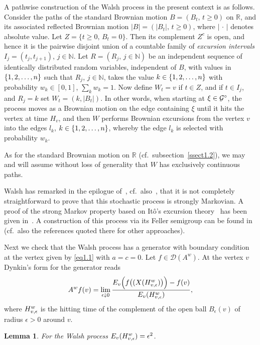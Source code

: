 \documentclass[11pt,a4paper]{amsart}
\newcommand{\gep}{\epsilon}
\newcommand{\cD}{\mathcal{D}}
\newcommand{\cG}{\mathcal{G}}
\newcommand{\1}{1}
\newcommand{\N}{\mathbb{N}}
\newcommand{\R}{\mathbb{R}}
\newtheorem{lemma}[theorem]{Lemma}
\theoremstyle{remark}
\newcommand{\op}{\ensuremath^\circ}
\newcommand{\cGo}{\ensuremath\cG\op}
\newcommand{\sn}{\ensuremath\{1,2,\dotsc,n\}}
\newcommand{\da}{\ensuremath\downarrow}
\newcommand{\TW}{\ensuremath H^w}
\numberwithin{equation}{section}
\begin{document}
A pathwise construction of the Walsh process in the present context is as follows.
Consider the paths of the standard Brownian motion $B=(B_t,\,t\ge 0)$ on $\R$, and
its associated reflected Brownian motion $|B|=(|B_t|,\,t\ge 0)$, where $|\,\cdot\,|$
denotes absolute value. Let $Z=\{t\ge 0,\,B_t=0\}$. Then its complement $Z^c$ is
open, and hence it is the pairwise disjoint union of a countable family of
\emph{excursion intervals} $I_j = (t_j, t_{j+1})$, $j\in\N$. Let $R=(R_j,\,j\in\N)$
be an independent sequence of identically distributed random variables, independent of $B$,
with values in $\sn$ such that $R_j$, $j\in\N$, takes the value $k\in\sn$ with probability
$w_k\in [0,1]$, $\sum_k w_k =1$. Now define $W_t = v$ if $t\in Z$, and if $t\in I_j$, and
$R_j = k$ set $W_t = (k, |B_t|)$. In other words, when starting at $\xi\in\cGo$, the
process moves as a Brownian motion on the edge containing $\xi$ until it hits the
vertex at time $H_v$, and then $W$ performs Brownian excursions
from the vertex $v$ into the edges $l_k$, $k\in\sn$, whereby the edge $l_k$ is
selected with probability $w_k$.

As for the standard Brownian motion on $\R$ (cf.\ subsection~\ref{ssect1.2}), we
may and will assume without loss of generality that $W$ has exclusively continuous
paths.

Walsh has remarked in the epilogue of~\cite{Wa78}, cf.\ also~\cite{BaPi89}, that it
is not completely straightforward to prove that this stochastic process is strongly
Markovian. A proof of the strong Markov property based on It\^o's excursion
theory~\cite{It71a} has been given in~\cite{Sa86a, Sa86b}. A construction of this
process via its Feller semigroup can be found in~\cite{BaPi89} (cf.\ also the references
quoted there for other approaches).

Next we check that the Walsh process has a generator with boundary condition at the
vertex given by \eqref{eq1.1} with $a=c=0$. Let $f\in\cD(A^w)$. At the vertex $v$
Dynkin's form for the generator reads
\begin{equation}    \label{eq2.1}
    A^w f(v) = \lim_{\gep\da 0} \frac{E_v\Bigl(f\bigl((X(\TW_{v,\gep})\bigr)\Bigr)-f(v)}
                                  {E_v(\TW_{v,\gep})},
\end{equation}
where $\TW_{v,\gep}$ is the hitting time of the complement of the open ball
$B_\gep(v)$ of radius $\gep>0$ around $v$.

\begin{lemma}   \label{lem2.1}
For the Walsh process $E_v(\TW_{v,\gep}) = \gep^2$.
\end{lemma}
\end{document}
